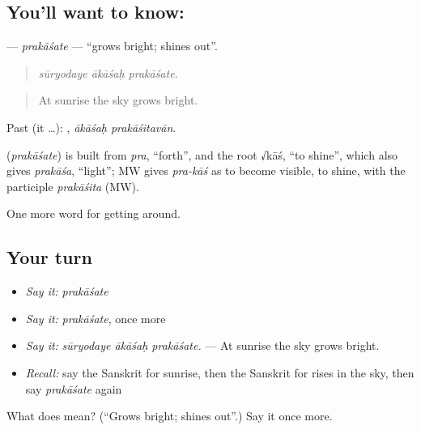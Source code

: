 \subsection*{You'll want to know: }
\textbf{} — \emph{prakāśate} — \textquotedblleft{}grows bright; shines out\textquotedblright{}.

\begin{quote}
  
\end{quote}

\begin{quote}
\emph{sūryodaye ākāśaḥ prakāśate.}
\end{quote}

\begin{quote}
At sunrise the sky grows bright.
\end{quote}

Past (it …):  , \emph{ākāśaḥ prakāśitavān}.

\begin{cousinweb}
\textbf{} (\emph{prakāśate}) is built from \emph{pra}, \textquotedblleft{}forth\textquotedblright{}, and the root √kāś, \textquotedblleft{}to shine\textquotedblright{}, which also gives \emph{prakāśa}, \textquotedblleft{}light\textquotedblright{}; MW gives \emph{pra-kāś} as to become visible, to shine, with the participle \emph{prakāśita} (MW).
\end{cousinweb}

\begin{grammarlens}[title={What you've built}]
One more word for getting around.
\end{grammarlens}

\subsection*{Your turn}
\begin{itemize}
\raggedright
  \item \emph{Say it:} \emph{prakāśate}
  \item \emph{Say it:} \emph{prakāśate}, once more
  \item \emph{Say it:} \emph{sūryodaye ākāśaḥ prakāśate.} — At sunrise the sky grows bright.
  \item \emph{Recall:} say the Sanskrit for sunrise, then the Sanskrit for rises in the sky, then say \emph{prakāśate} again
\end{itemize}

\begin{tcolorbox}[breakable,colback=teal!4,colframe=teal!35!black,title={Before you move on}]
What does  mean? (\textquotedblleft{}Grows bright; shines out\textquotedblright{}.) Say it once more.
\end{tcolorbox}
